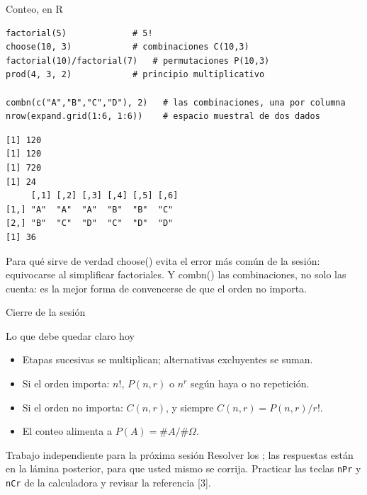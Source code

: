 \documentclass[aspectratio=169,10pt]{beamer}
\newcommand{\fx}[1]{{\ttfamily\color{uniAzul}#1}}
\begin{document}
\begin{frame}[fragile]{Conteo, en R}
  \scriptsize
\begin{lstlisting}[style=Rmini]
factorial(5)             # 5!
choose(10, 3)            # combinaciones C(10,3)
factorial(10)/factorial(7)   # permutaciones P(10,3)
prod(4, 3, 2)            # principio multiplicativo

combn(c("A","B","C","D"), 2)   # las combinaciones, una por columna
nrow(expand.grid(1:6, 1:6))    # espacio muestral de dos dados
\end{lstlisting}
\begin{lstlisting}[style=Rout]
[1] 120
[1] 120
[1] 720
[1] 24
     [,1] [,2] [,3] [,4] [,5] [,6]
[1,] "A"  "A"  "A"  "B"  "B"  "C"
[2,] "B"  "C"  "D"  "C"  "D"  "D"
[1] 36
\end{lstlisting}

  \vspace{-0.1cm}
  \begin{alertblock}{Para qué sirve de verdad}
    \tiny
    \fx{choose()} evita el error más común de la sesión: equivocarse al
    simplificar factoriales. Y \fx{combn()}  las
    combinaciones, no solo las cuenta: es la mejor forma de convencerse de que
    el orden no importa.
  \end{alertblock}
\end{frame}

\begin{frame}{Cierre de la sesión}
  \begin{block}{Lo que debe quedar claro hoy}
    \begin{itemize}
      \item Etapas sucesivas se multiplican; alternativas excluyentes se suman.
      \item Si el orden importa: $n!$, $P(n,r)$ o $n^{r}$ según haya o no
            repetición.
      \item Si el orden no importa: $C(n,r)$, y siempre $C(n,r)=P(n,r)/r!$.
      \item El conteo alimenta a $P(A)=\#A/\#\Omega$.
    \end{itemize}
  \end{block}

  \vspace{0.25cm}
  \begin{alertblock}{Trabajo independiente para la próxima sesión}
    \footnotesize
    Resolver los ; las
    respuestas están en la lámina posterior, para que usted mismo se corrija.
    Practicar las teclas \texttt{nPr} y \texttt{nCr} de la calculadora y
    revisar la referencia [3].
  \end{alertblock}
\end{frame}
\end{document}
